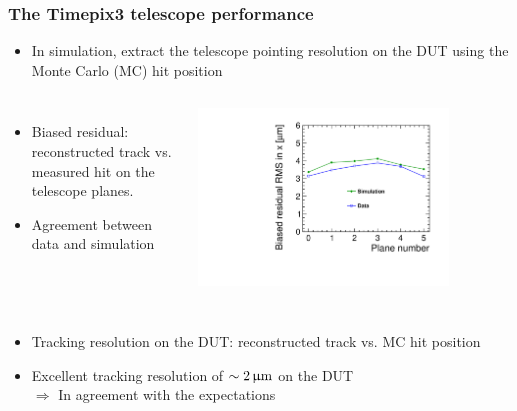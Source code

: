 \begin{frame}
  \frametitle{The Timepix3 telescope performance}

  \begin{itemize}
  \item In simulation, extract the telescope pointing resolution on
    the DUT using the Monte Carlo (MC) hit position
  \end{itemize}

  \begin{columns}
    \begin{itemize}
    \item Biased residual: reconstructed track vs. measured hit on the
      telescope planes.
    \item Agreement between data and simulation 
    \end{itemize}

    \centering
    \includegraphics[width=0.8\textwidth]{../figures/Telescope/biasedResiduals/RMSX_simu_vs_data.pdf}
  \end{columns}

  \begin{columns}
    \begin{itemize}
    \item Tracking resolution on the DUT: reconstructed track vs. MC
      hit position
    \item Excellent tracking resolution of
      \textcolor{Green}{$\sim2\,\upmu\mathrm{m}$} on the DUT
      \\
      $\Rightarrow$ In agreement with the expectations 
    \end{itemize}


\end{columns}
\end{frame}
